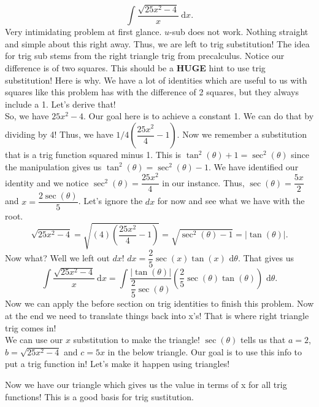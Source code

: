 \documentclass[10pt]{article}
\newcommand{\dx}{\:\mathrm{d}x}
\theoremstyle{Theorem}
\theoremstyle{definition}
\theoremstyle{remark}
\theoremstyle{custom}
\begin{document}
$$\int \dfrac{\sqrt{25x^2-4}}{x} \dx.$$
Very intimidating problem at first glance.  $u$-sub does not work. Nothing straight and simple about this right away. Thus, we are left to trig substitution! The idea for trig sub stems from the right triangle trig from precalculus.  Notice our difference is of two squares. This should be a \textbf{HUGE} hint to use trig substitution! Here is why.
We have a lot of identities which are useful to us with squares like this problem has with the difference of 2 squares, but they always include a 1. Let's derive that!\\
 So, we have $25x^2-4$. Our goal here is to achieve a constant 1. We can do that by dividing by 4! Thus, we have $1/4\left(\dfrac{25x^2}{4}-1\right)$. Now we remember a substitution that is a trig function squared minus 1. This is $\tan^2(\theta)+1=\sec^2(\theta)$ since the manipulation gives us $\tan^2(\theta)=\sec^2(\theta)-1$. We have identified our identity and we notice $\sec^2(\theta)=\dfrac{25x^2}{4}$ in our instance.  Thus, $\sec(\theta)=\dfrac{5x}{2}$ and $x=\dfrac{2\sec(\theta)}{5}$. Let's ignore the $dx$ for now and see what we have with the root.
 $$\sqrt{25x^2-4}=\sqrt{(4)\left(\dfrac{25x^2}{4}-1\right)}=\sqrt{\sec^2(\theta)-1}=|\tan(\theta)|.$$ 
 Now what? Well we left out $dx$! $dx=\dfrac{2}{5}\sec(x)\tan(x) \text{ d} \theta$.
 That gives us
 $$\int \dfrac{\sqrt{25x^2-4}}{x} \dx=\int \dfrac{|\tan(\theta)|}{\dfrac{2}{5}\sec(\theta)}\left(\dfrac{2}{5}\sec(\theta)\tan(\theta)\right) \text{ d}\theta.$$
 Now we can apply the before section on trig identities to finish this problem. Now at the end we need to translate things back into x's! That is where right triangle trig comes in!\\
We can use our $x$ substitution to make the triangle! $\sec(\theta)$ tells us that  $a=2$, $b=\sqrt{25x^2-4}$ and $c=5x$ in the below triangle. Our goal is to use this info to put a trig function in! Let's make it happen using triangles!  
\begin{center}
\end{center}
 Now we have our triangle which gives us the value in terms of x for all trig functions! This is a good basis for trig sustitution.\\\\
\end{document}
